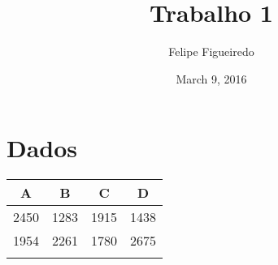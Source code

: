 \documentclass[]{article}
\title{Trabalho 1}
\author{Felipe Figueiredo}
\date{March 9, 2016}
\begin{document}
\maketitle


\section{Dados}\label{dados}

\begin{longtable}[c]{@{}cccc@{}}
\toprule
\begin{minipage}[b]{0.06\columnwidth}\centering\strut
A
\strut\end{minipage} &
\begin{minipage}[b]{0.06\columnwidth}\centering\strut
B
\strut\end{minipage} &
\begin{minipage}[b]{0.06\columnwidth}\centering\strut
C
\strut\end{minipage} &
\begin{minipage}[b]{0.06\columnwidth}\centering\strut
D
\strut\end{minipage}\tabularnewline
\midrule
\endhead
\begin{minipage}[t]{0.06\columnwidth}\centering\strut
2450
\strut\end{minipage} &
\begin{minipage}[t]{0.06\columnwidth}\centering\strut
1283
\strut\end{minipage} &
\begin{minipage}[t]{0.06\columnwidth}\centering\strut
1915
\strut\end{minipage} &
\begin{minipage}[t]{0.06\columnwidth}\centering\strut
1438
\strut\end{minipage}\tabularnewline
\begin{minipage}[t]{0.06\columnwidth}\centering\strut
1954
\strut\end{minipage} &
\begin{minipage}[t]{0.06\columnwidth}\centering\strut
2261
\strut\end{minipage} &
\begin{minipage}[t]{0.06\columnwidth}\centering\strut
1780
\strut\end{minipage} &
\begin{minipage}[t]{0.06\columnwidth}\centering\strut
2675
\strut\end{minipage}\tabularnewline
\begin{minipage}[t]{0.06\columnwidth}\centering\strut

\end{minipage}
\end{longtable}
\end{document}
